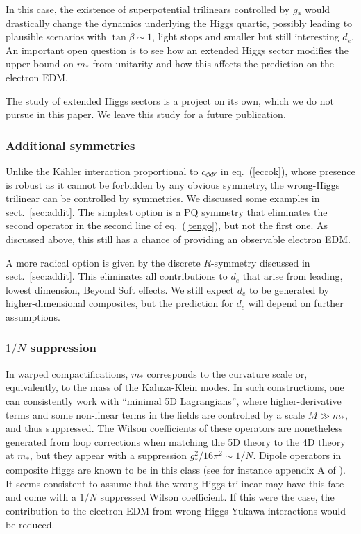 \documentclass[a4paper,12pt]{article}
\def\eq#1{eq.~(\ref{#1})}
\def\eq#1{eq.~(\ref{#1})}
\def\sec#1{sect.~\ref{#1}}
\def\mst{m_*}
\begin{document}
{{{{In this case, the existence of superpotential trilinears controlled by $g_*$ would drastically change the dynamics underlying the Higgs quartic, possibly leading to plausible scenarios with $\tan\beta\sim 1$, light stops and smaller but still interesting $d_e$. An important open question is to see how an extended Higgs sector modifies the upper bound on $\mst$ from unitarity and how this affects the prediction on the electron EDM.

The study of extended Higgs sectors is a project on its own, which we do not pursue in this paper. We leave this study for a future publication.

\subsubsection*{Additional symmetries} 

Unlike the K\"ahler interaction proportional to $c_{\Phi \Phi'}$ in \eq{eccok}, whose presence is robust as it cannot be forbidden by any obvious symmetry, the wrong-Higgs trilinear can be controlled by symmetries. We discussed some examples in \sec{sec:addit}. The simplest option is a PQ symmetry that eliminates the second operator in the second line of \eq{tengo}, but not the first one. As discussed above, this still has a chance of providing an observable electron EDM.

A more radical option is given by the discrete $R$-symmetry discussed in \sec{sec:addit}. This eliminates all contributions to $d_e$
that arise from leading, lowest dimension, Beyond Soft effects. We still expect $d_e$ to be generated by higher-dimensional composites, but the prediction for $d_e$ will depend on further assumptions.

\boldmath
\subsubsection*{$1/N$ suppression}
\unboldmath

In warped compactifications, $m_*$ corresponds to the curvature scale or, equivalently, to the mass of the Kaluza-Klein modes. In such constructions, one can consistently work
with ``minimal 5D Lagrangians'', where higher-derivative terms and some non-linear terms in the fields are controlled by a scale $M\gg m_*$, and thus suppressed. The Wilson coefficients of these operators are nonetheless generated from loop corrections when matching the 5D theory to the 4D theory at $m_*$, but they appear with a suppression $g_*^2/16\pi^2\sim 1/N$. Dipole operators in composite Higgs are known to be in this class (see for instance appendix
A of \cite{Liu:2016idz}). It seems consistent to assume that the wrong-Higgs trilinear may have this fate and come with a $1/N$ suppressed Wilson coefficient. If this were the case, the contribution to the electron EDM from wrong-Higgs Yukawa interactions would be reduced.

}}}}
\end{document}
